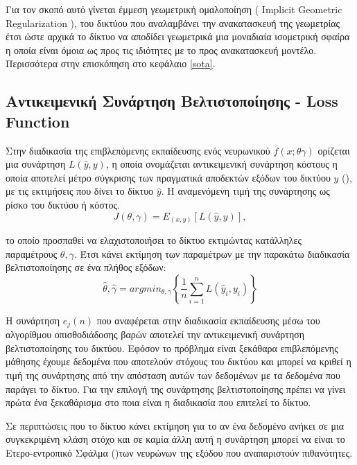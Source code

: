     Για τον σκοπό αυτό γίνεται  έμμεση γεωμετρική ομαλοποίηση ( Implicit Geometric Regularization \cite{gropp2020implicit}), του δικτύου που αναλαμβάνει την ανακατασκευή της γεωμετρίας έτσι ώστε αρχικά το δίκτυο να αποδίδει γεωμετρικά μια μοναδιαία ισομετρική σφαίρα η οποία είναι όμοια ως προς τις ιδιότητες με το προς ανακατασκευή μοντέλο. Περισσότερα στην επισκόπηση στο κεφάλαιο \ref{sota}.
                                                                                              
\subsection{Αντικειμενική Συνάρτηση Βελτιστοποίησης - Loss Function}

\par 
    Στην διαδικασία της επιβλεπόμενης εκπαίδευσης ενός νευρωνικού $f(x;\theta\gamma)$ ορίζεται μια συνάρτηση \(L(\hat{y},y)\), η οποία ονομάζεται αντικειμενική συνάρτηση κόστους η οποία αποτελεί μέτρο σύγκρισης των πραγματικά αποδεκτών εξόδων του δικτύου $y$ (), με τις εκτιμήσεις που δίνει το δίκτυο $\hat{y}$. Η αναμενόμενη τιμή της συνάρτησης ως ρίσκο του δικτύου ή κόστος.
    \begin{equation*}
        J(\theta,\gamma)=E_{(x,y)}[L(\hat{y},y)],
        \label{eq:cost function}
    \end{equation*}
    
    το οποίο προσπαθεί να ελαχιστοποιήσει το δίκτυο εκτιμώντας κατάλληλες παραμέτρους $\theta,\gamma$. Έτσι κάνει εκτίμηση των παραμέτρων με την παρακάτω διαδικασία βελτιστοποίησης σε ένα πλήθος εξόδων:
    $$  \hat{\theta},\hat{\gamma}=a r g m i n_{\theta,\gamma}\left\{\frac{1}{n}\sum_{i=1}^{n}L(\hat{y}_{i},y_{i})\right\} $$
    
\par
    Η συνάρτηση $e_{j}(n)$ που αναφέρεται στην διαδικασία εκπαίδευσης μέσω του αλγορίθμου οπισθοδιάδοσης βαρών αποτελεί την αντικειμενική συνάρτηση βελτιστοποίησης του δικτύου. Εφόσον το πρόβλημα είναι ξεκάθαρα επιβλεπόμενης μάθησης έχουμε δεδομένα που αποτελούν στόχους του δικτύου και μπορεί να κριθεί η τιμή της συνάρτησης από την απόσταση αυτών των δεδομένων με τα δεδομένα που παράγει το δίκτυο. Για την επιλογή της συνάρτησης βελτιστοποίησης πρέπει να γίνει πρώτα ένα ξεκαθάρισμα στο ποια είναι η διαδικασία που επιτελεί το δίκτυο. 
\par
    Σε περιπτώσεις που το δίκτυο κάνει εκτίμηση για το αν ένα δεδομένο ανήκει σε μια συγκεκριμένη κλάση στόχο και σε καμία άλλη αυτή η συνάρτηση μπορεί να είναι το Ετερο-εντροπικό Σφάλμα ()των νευρώνων της εξόδου που αναπαριστούν πιθανότητες.
    
